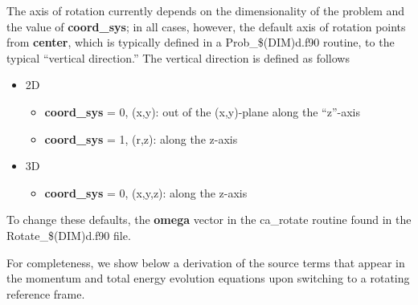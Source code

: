 The axis of rotation currently depends on the dimensionality of the
problem and the value of {\bf coord\_sys}; in all cases, however, the
default axis of rotation points from {\bf center}, which is typically
defined in a Prob\_\$(DIM)d.f90 routine, to the typical ``vertical
direction.''  The vertical direction is defined as follows
\begin{itemize}
\item 2D
\begin{itemize}
\item {\bf coord\_sys} = 0, (x,y): out of the (x,y)-plane along the ``z''-axis
\item {\bf coord\_sys} = 1, (r,z): along the z-axis
\end{itemize}
\item 3D
\begin{itemize}
\item {\bf coord\_sys} = 0, (x,y,z): along the z-axis
\end{itemize}
\end{itemize}
To change these defaults, the {\bf omega} vector in the ca\_rotate
routine found in the Rotate\_\$(DIM)d.f90 file.

For completeness, we show below a derivation of the source terms that
appear in the momentum and total energy evolution equations upon
switching to a rotating reference frame.


